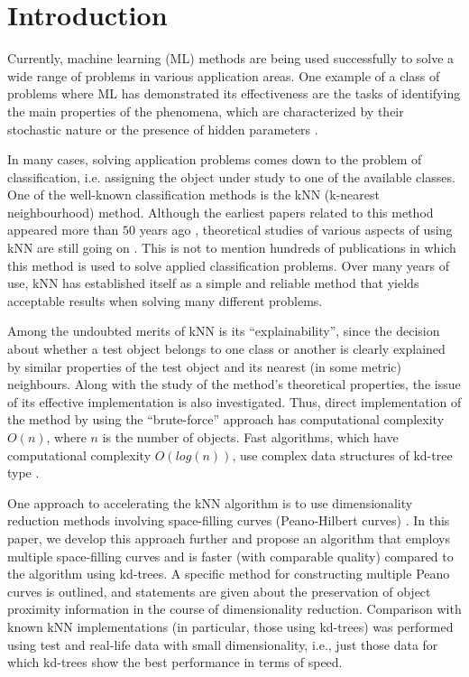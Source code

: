 \documentclass[sensors,article,submit,moreauthors,pdftex]{Definitions/mdpi}
\begin{document}

\section{Introduction}

Currently, machine learning (ML) methods are being used successfully to solve a wide range of problems in various application areas. One example of a class of problems where ML has demonstrated its effectiveness are the tasks of identifying the main properties of the phenomena, which are characterized by their stochastic nature or the presence of hidden parameters \cite{Golovenkin2020,Gonoskov2019,Kastalskiy2021}.

In many cases, solving application problems comes down to the problem of classification, i.e. assigning the object under study to one of the available classes. One of the well-known classification methods is the kNN (k-nearest neighbourhood) method. Although the earliest papers related to this method appeared more than $50$ years ago \cite{Cover1967, Cover1968}, theoretical studies of various aspects of using kNN are still going on \cite{Pestov2013,Mirkes2020}. This is not to mention hundreds of publications in which this method is used to solve applied classification problems. Over many years of use, kNN has established itself as a simple and reliable method that yields acceptable results when solving many different problems. 

Among the undoubted merits of kNN is its ``explainability'', since the decision about whether a test object belongs to one class or another is clearly explained by similar properties of the test object and its nearest (in some metric) neighbours.
Along with the study of the method's theoretical properties, the issue of its effective implementation is also investigated. Thus, direct implementation of the method by using the  ``brute-force'' approach has computational complexity $O(n)$, where $n$ is the number of objects. Fast algorithms, which have computational complexity $O(log(n))$, use complex data structures of kd-tree type \cite{Bentley1975MultidimensionalBS}.

One approach to accelerating the kNN algorithm is to use dimensionality reduction methods involving space-filling curves (Peano-Hilbert curves) \cite{Liao2001, Schubert2015FastAS}. In this paper, we develop this approach further and propose an algorithm that employs multiple space-filling curves and is faster (with comparable quality) compared to the algorithm using kd-trees. A specific method for constructing multiple Peano curves is outlined, and statements are given about the preservation of object proximity information in the course of dimensionality reduction. Comparison with known kNN implementations (in particular, those using kd-trees) was performed using test and real-life data with small dimensionality, i.e., just those data for which kd-trees show the best performance in terms of speed.
\end{document}

